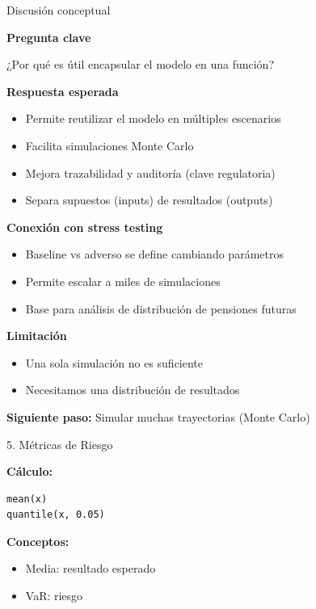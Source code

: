 \documentclass[10pt]{beamer}
\begin{document}
\begin{frame}{Discusión conceptual}

\textbf{Pregunta clave}

\vspace{0.3cm}
¿Por qué es útil encapsular el modelo en una función?

\vspace{0.4cm}

\textbf{Respuesta esperada}

\begin{itemize}
\item Permite reutilizar el modelo en múltiples escenarios
\item Facilita simulaciones Monte Carlo
\item Mejora trazabilidad y auditoría (clave regulatoria)
\item Separa supuestos (inputs) de resultados (outputs)
\end{itemize}

\vspace{0.4cm}

\textbf{Conexión con stress testing}

\begin{itemize}
\item Baseline vs adverso se define cambiando parámetros
\item Permite escalar a miles de simulaciones
\item Base para análisis de distribución de pensiones futuras
\end{itemize}

\textbf{Limitación}

\begin{itemize}
\item Una sola simulación no es suficiente
\item Necesitamos una distribución de resultados
\end{itemize}

\vspace{0.3cm}

\textbf{Siguiente paso:}
Simular muchas trayectorias (Monte Carlo)

\end{frame}
\begin{frame}[fragile]{5. Métricas de Riesgo}

\textbf{Cálculo:}

\begin{verbatim}
mean(x)
quantile(x, 0.05)
\end{verbatim}

\vspace{0.3cm}

\textbf{Conceptos:}

\begin{itemize}
\item Media: resultado esperado
\item VaR: riesgo
\end{itemize}

\end{frame}
\end{document}
